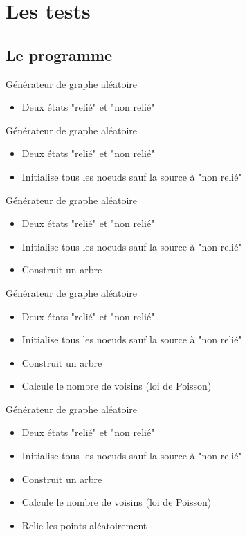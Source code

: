\documentclass[hyperref={},
xcolor={dvipsnames,svgnames,table},10pt]{beamer}
\begin{document}
\section{Les tests}

\subsection{Le programme}

\begin{frame}{Générateur de graphe aléatoire}
	\begin{itemize}
		\item Deux états "relié" et "non relié"
	\end{itemize}
\end{frame}

\begin{frame}{Générateur de graphe aléatoire}
	\begin{itemize}
		\item Deux états "relié" et "non relié"
		\item Initialise tous les noeuds sauf la source à "non relié"
	\end{itemize}
\end{frame}

\begin{frame}{Générateur de graphe aléatoire}
	\begin{itemize}
		\item Deux états "relié" et "non relié"
		\item Initialise tous les noeuds sauf la source à "non relié"
		\item Construit un arbre
	\end{itemize}
\end{frame}

\begin{frame}{Générateur de graphe aléatoire}
	\begin{itemize}
		\item Deux états "relié" et "non relié"
		\item Initialise tous les noeuds sauf la source à "non relié"
		\item Construit un arbre
		\item Calcule le nombre de voisins (loi de Poisson)
	\end{itemize}
\end{frame}

\begin{frame}{Générateur de graphe aléatoire}
	\begin{itemize}
		\item Deux états "relié" et "non relié"
		\item Initialise tous les noeuds sauf la source à "non relié"
		\item Construit un arbre
		\item Calcule le nombre de voisins (loi de Poisson)
		\item Relie les points aléatoirement
	\end{itemize}
\end{frame}
\end{document}
